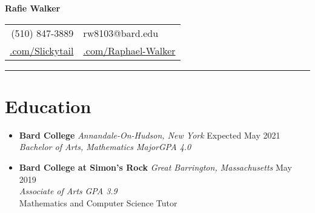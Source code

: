 \documentclass[12pt,letterpaper]{article}
\begin{document}
\begin{center}
	{\LARGE{\textbf{Rafie Walker}}}\\[0.05in]

	\begin{tabular}{r @{\hskip 0.1in}|@{\hskip 0.1in} l}
		(510) 847-3889 & rw8103@bard.edu \\
		 \href{https://github.com/Slickytail}{\faGithub.com/Slickytail} &
		 \href{https://linkedin.com/in/raphael-walker}{\faLinkedinSquare.com/Raphael-Walker}
	\end{tabular}
\end{center}
\hrule \vspace{-0.5em}

\section*{Education} \vspace{-0.5em}
\begin{itemize}[label=,itemsep=0pt]
	\item
	\textbf{Bard College} \textit{Annandale-On-Hudson, New York} \hfill Expected May 2021\\
    \textit{Bachelor of Arts, Mathematics Major}\hfill \textit{GPA 4.0}
	\item
	\textbf{Bard College at Simon's Rock} \textit{Great Barrington, Massachusetts} \hfill May 2019\\
	\textit{Associate of Arts} \hfill \textit{GPA 3.9}\\
	Mathematics and Computer Science Tutor
\end{itemize}
\vspace{-2em}
\end{document}
